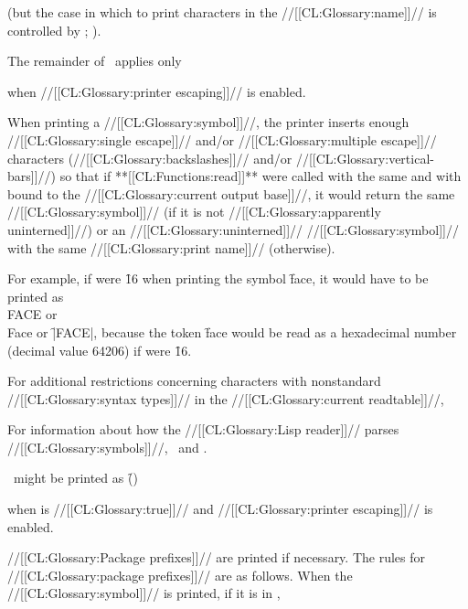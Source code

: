 
(but the case in which to print characters in the //[[CL:Glossary:name]]// is controlled by ; \seesection\ReadtableCasePrintEffect).

The remainder of \thissection\ applies only  

when //[[CL:Glossary:printer escaping]]// is enabled.


When printing a //[[CL:Glossary:symbol]]//, the printer inserts enough  //[[CL:Glossary:single escape]]// and/or //[[CL:Glossary:multiple escape]]// characters (//[[CL:Glossary:backslashes]]// and/or //[[CL:Glossary:vertical-bars]]//) so that if **[[CL:Functions:read]]** were called with the same  and with  bound to the //[[CL:Glossary:current output base]]//, it would return the same //[[CL:Glossary:symbol]]// (if it is not  //[[CL:Glossary:apparently uninterned]]//) or an //[[CL:Glossary:uninterned]]// //[[CL:Glossary:symbol]]// with the same //[[CL:Glossary:print name]]// (otherwise).

For example, if  were \f{16}  when printing the symbol \f{face}, it would have to be printed as \f{\\FACE} or \f{\\Face} or \f{|FACE|},  because the token \f{face} would be read as a hexadecimal number (decimal value 64206) if  were \f{16}.

For additional restrictions concerning characters with  nonstandard //[[CL:Glossary:syntax types]]// in the //[[CL:Glossary:current readtable]]//,  

For information about how the //[[CL:Glossary:Lisp reader]]// parses //[[CL:Glossary:symbols]]//, \seesection\SymbolTokens\ and \secref\SharpsignColon.

\nil\ might be printed as \f{()}  

when  is //[[CL:Glossary:true]]// and //[[CL:Glossary:printer escaping]]// is enabled.


//[[CL:Glossary:Package prefixes]]// are printed if necessary. The rules for //[[CL:Glossary:package prefixes]]// are as follows. When the //[[CL:Glossary:symbol]]// is printed, if it is in , 

